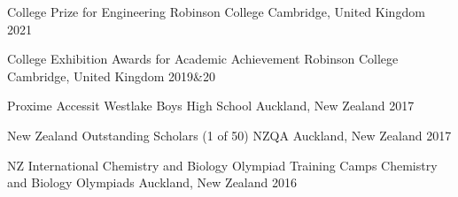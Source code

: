



\begin{cvhonors}

  \cvhonor
    {College Prize for Engineering} %
    {Robinson College} %
    {Cambridge, United Kingdom} %
    {2021} %

  \cvhonor
    {College Exhibition Awards for Academic Achievement} %
    {Robinson College} %
    {Cambridge, United Kingdom} %
    {2019\&20} %

  \cvhonor
    {Proxime Accessit} %
    {Westlake Boys High School } %
    {Auckland, New Zealand} %
    {2017} %

  \cvhonor
    {New Zealand Outstanding Scholars (1 of 50)} %
    {NZQA} %
    {Auckland, New Zealand} %
    {2017} %

  \cvhonor
    {NZ International Chemistry and Biology Olympiad Training Camps} %
    {Chemistry and Biology Olympiads}
    {Auckland, New Zealand} %
    {2016} %

\end{cvhonors}